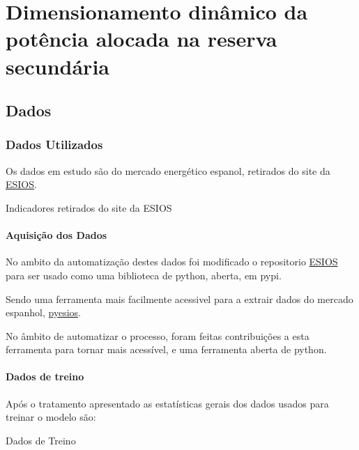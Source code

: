\part{Dimensionamento dinâmico da potência alocada na reserva secundária}

\chapter{Dados}
\section{Dados Utilizados\label{se:dadosestudo}}

Os dados em estudo são do mercado energético espanol, retirados do site da \href{https://www.esios.ree.es/es}{\gls{ESIOS}}.


\begin{table}[H]
    \caption{Indicadores retirados do site da ESIOS}    
\end{table}


\subsection{Aquisição dos Dados}

No ambito da automatização destes dados foi modificado o repositorio \href{https://github.com/SanPen/\gls{ESIOS}}{\gls{ESIOS}} para ser usado como uma biblioteca de python, aberta, em pypi.\par
Sendo uma ferramenta mais facilmente acessivel para a extrair dados do mercado espanhol, \href{https://pypi.org/project/pyesios/}{pyesios}.\par
No âmbito de automatizar o processo, foram feitas contribuições a esta ferramenta para tornar mais acessível, e uma ferramenta aberta de python.\par


\thispagestyle{plain}
 \label{se:dadoscrus}



\thispagestyle{plain}
 \label{se:tratamentodados}

\subsection{Dados de treino}

Após o tratamento apresentado as estatísticas gerais dos dados usados para treinar o modelo são:

\begin{table}[H]
    \caption{Dados de Treino}    
    \resizebox{\linewidth}{!}{}
    \end{table}
